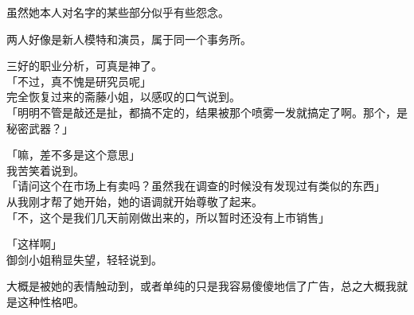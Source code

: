 虽然她本人对名字的某些部分似乎有些怨念。

两人好像是新人模特和演员，属于同一个事务所。

三好的职业分析，可真是神了。\\

「不过，真不愧是研究员呢」\\

完全恢复过来的斋藤小姐，以感叹的口气说到。\\

「明明不管是敲还是扯，都搞不定的，结果被那个喷雾一发就搞定了啊。那个，是秘密武器？」

「嘛，差不多是这个意思」\\

我苦笑着说到。\\

「请问这个在市场上有卖吗？虽然我在调查的时候没有发现过有类似的东西」\\

从我刚才帮了她开始，她的语调就开始尊敬了起来。\\

「不，这个是我们几天前刚做出来的，所以暂时还没有上市销售」

「这样啊」\\

御剑小姐稍显失望，轻轻说到。

大概是被她的表情触动到，或者单纯的只是我容易傻傻地信了广告，总之大概我就是这种性格吧。\\

